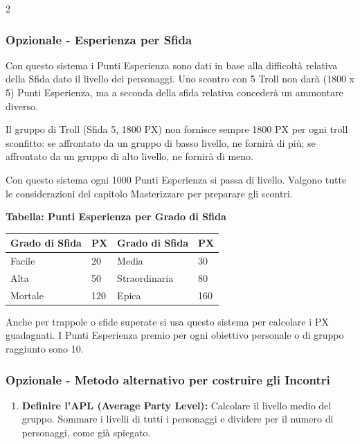 \begin{multicols}{2}
\subsubsection{Opzionale - Esperienza per Sfida}

Con questo sistema i Punti Esperienza sono dati in base alla difficoltà relativa della Sfida dato il livello dei personaggi. Uno scontro con 5 Troll non darà (1800 x 5) Punti Esperienza, ma a seconda della sfida relativa concederà un ammontare diverso.

Il gruppo di Troll (Sfida 5, 1800 PX) non fornisce sempre 1800 PX per ogni troll sconfitto: se affrontato da un gruppo di basso livello, ne fornirà di più; se affrontato da un gruppo di alto livello, ne fornirà di meno.

Con questo sistema ogni 1000 Punti Esperienza si passa di livello. Valgono tutte le considerazioni del capitolo Masterizzare per preparare gli scontri.

\medskip

\textbf{Tabella: Punti Esperienza per Grado di Sfida}

\medskip

\noindent\begin{tabularx}{\linewidth}{ll|ll}
\toprule
\rowcolor{gray!20}\textbf{Grado di Sfida} & \textbf{PX}&\textbf{Grado di Sfida} & \textbf{PX}\\
\toprule
Facile& 20& Media& 30\\
\rowcolor{gray!20}Alta& 50& Straordinaria& 80\\
Mortale& 120& Epica& 160
\end{tabularx}

\medskip

Anche per trappole o sfide superate si usa questo sistema per calcolare i PX guadagnati. I Punti Esperienza premio per ogni obiettivo personale o di gruppo raggiunto sono 10.

\subsubsection{Opzionale - Metodo alternativo per costruire gli Incontri}

\begin{enumerate}[leftmargin=*] \setlength{\itemsep}{0pt}

\item \textbf{Definire l'APL (Average Party Level):} Calcolare il livello medio del gruppo. Sommare i livelli di tutti i personaggi e dividere per il numero di personaggi, come già spiegato.


\end{enumerate}
\end{multicols}
